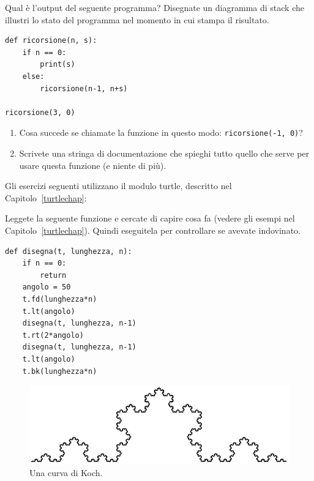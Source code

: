\documentclass[10pt]{book}
\begin{document}
\vspace{0.2in}
\begin{exercise}

Qual è l'output del seguente programma?
Disegnate un diagramma di stack che illustri lo stato del programma nel momento in cui stampa il risultato.

\begin{verbatim}
def ricorsione(n, s):
    if n == 0:
        print(s)
    else:
        ricorsione(n-1, n+s)

ricorsione(3, 0)
\end{verbatim}

\begin{enumerate}

\item Cosa succede se chiamate la funzione in questo modo: {\tt ricorsione(-1, 0)}?

\item Scrivete una stringa di documentazione che spieghi tutto quello che serve per usare questa funzione (e niente di più).

\end{enumerate}

\end{exercise}

Gli esercizi seguenti utilizzano il modulo turtle, descritto nel Capitolo~\ref{turtlechap}:

\vspace{0.2in}
\begin{exercise}

Leggete la seguente funzione e cercate di capire cosa fa (vedere gli esempi nel Capitolo~\ref{turtlechap}). Quindi eseguitela per controllare se avevate indovinato.

\begin{verbatim}
def disegna(t, lunghezza, n):
    if n == 0:
        return
    angolo = 50
    t.fd(lunghezza*n)
    t.lt(angolo)
    disegna(t, lunghezza, n-1)
    t.rt(2*angolo)
    disegna(t, lunghezza, n-1)
    t.lt(angolo)
    t.bk(lunghezza*n)
\end{verbatim}

\end{exercise}
\begin{figure}
\centerline
{\includegraphics[scale=0.8]{figs/koch.pdf}}
\caption{Una curva di Koch.}
\label{fig.koch}
\end{figure}
\end{document}
